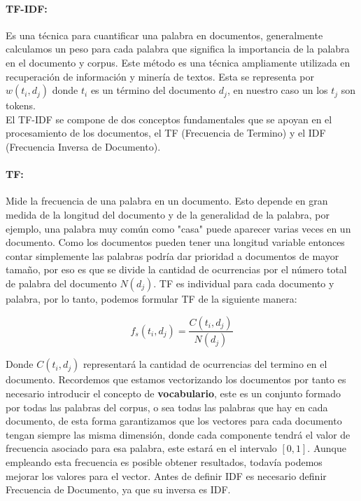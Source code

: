 \documentclass[runningheads,a4paper]{llncs}
\begin{document}
\paragraph*{TF-IDF:} Es una técnica para cuantificar una palabra en documentos, generalmente calculamos un peso para cada palabra que significa la importancia de la palabra en el documento y corpus. Este método es una técnica ampliamente utilizada en recuperación de información y minería de textos. Esta se representa por $w(t_i, d_j)$ donde $t_i$ es un término del documento $d_j$, en nuestro caso un los $t_j$ son tokens. \\

El TF-IDF se compone de dos conceptos fundamentales que se apoyan en el procesamiento de los documentos, el TF (Frecuencia de Termino) y el IDF (Frecuencia Inversa de Documento).

\paragraph*{TF:} Mide la frecuencia de una palabra en un documento. Esto depende en gran medida de la longitud del documento y de la generalidad de la palabra, por ejemplo, una palabra muy común como "casa" puede aparecer varias veces en un documento. Como los documentos pueden tener una longitud variable entonces contar simplemente las palabras podría dar prioridad a documentos de mayor tamaño, por eso es que se divide la cantidad de ocurrencias por el número total de palabra del documento $N(d_j)$. TF es individual para cada documento y palabra, por lo tanto, podemos formular TF de la siguiente manera:

\begin{equation}
	f_s(t_i, d_j) = \frac{C(t_i, d_j)}{N(d_j)}
\end{equation}

Donde $C(t_i, d_j)$ representará la cantidad de ocurrencias del termino en el documento. Recordemos que estamos vectorizando los documentos por tanto es necesario introducir el concepto de \textbf{vocabulario}, este es un conjunto formado por todas las palabras del corpus, o sea todas las palabras que hay en cada documento, de esta forma garantizamos que los vectores para cada documento tengan siempre las misma dimensión, donde cada componente tendrá el valor de frecuencia asociado para esa palabra, este estará en el intervalo $[0,1]$. Aunque empleando esta frecuencia es posible obtener resultados, todavía podemos mejorar los valores para el vector. Antes de definir IDF es necesario definir Frecuencia de Documento, ya que su inversa es IDF.
\end{document}
